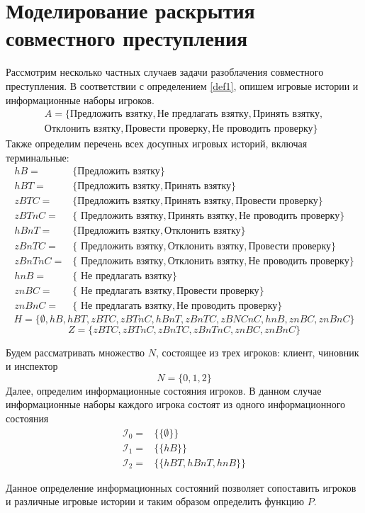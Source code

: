 \section{Моделирование раскрытия совместного преступления}

Рассмотрим несколько частных случаев задачи разоблачения совместного преступления. В соответствии с определением \ref{def1}, опишем игровые истории и информационные наборы игроков.
\begin{align*}
	A = \{\text{Предложить взятку}, \text{Не предлагать взятку}, \text{Принять взятку}, \\ \text{Отклонить взятку}, \text{Провести проверку}, \text{Не проводить проверку} \}
\end{align*}
Также определим перечень всех досупных игровых историй, включая терминальные:
\begin{align*}
hB = & \{\text{Предложить взятку}\} \\
hBT = & \{\text{Предложить взятку}, \text{Принять взятку}\} \\
zBTC = & \{\text{Предложить взятку}, \text{Принять взятку}, \text{Провести проверку}\} \\
zBTnC = & \{\text{ Предложить взятку}, \text{Принять взятку}, \text{Не проводить проверку}\} \\
hBnT = & \{ \text{Предложить взятку}, \text{Отклонить взятку} \} \\
zBnTC = & \{\text{ Предложить взятку}, \text{Отклонить взятку}, \text{Провести проверку}\} \\
zBnTnC = & \{\text{ Предложить взятку}, \text{Отклонить взятку}, \text{Не проводить проверку}\} \\
hnB = & \{\text{ Не предлагать взятку}\} \\
znBC = & \{\text{ Не предлагать взятку}, \text{Провести проверку}\} \\
znBnC = & \{\text{ Не предлагать взятку}, \text{Не проводить проверку} \}
\end{align*}
\begin{equation*}
	H = \{\emptyset, hB, hBT, zBTC, zBTnC, hBnT, zBnTC, zBNCnC, hnB, znBC, znBnC\}
\end{equation*}
\begin{equation*}
Z = \{zBTC, zBTnC, zBnTC, zBnTnC, znBC, znBnC\}
\end{equation*}
\par
Будем рассматривать множество $N$, состоящее из трех игроков: клиент, чиновник и инспектор
\begin{equation*}
N = \{0, 1, 2\}
\end{equation*}
Далее, определим информационные состояния игроков. В данном случае информационные наборы каждого игрока состоят из одного информационного состояния
\begin{align*}
\mathcal{I}_0 = & \{\{\emptyset\}\} \\
\mathcal{I}_1 = & \{\{hB\}\} \\
\mathcal{I}_2 = & \{\{hBT, hBnT, hnB\}\}
\end{align*}
\par
Данное определение информационных состояний позволяет сопоставить игроков и различные игровые истории и таким образом определить функцию $P$.

